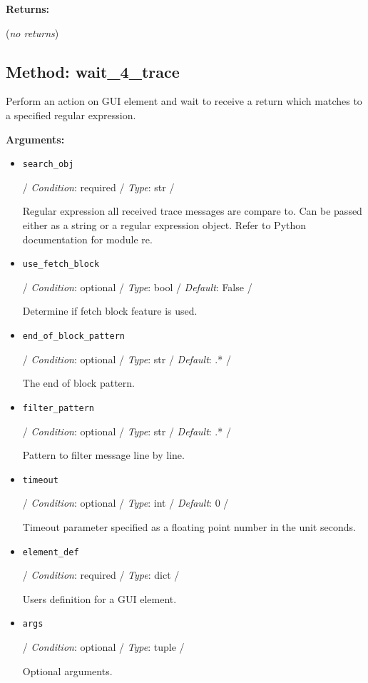 \textbf{Returns:}

(\emph{no returns})

\hypertarget{qconnectwinapp-winappdriver-winapp-client-winappclient-wait-4-trace}{%
\subsection{Method: wait\_4\_trace}\label{qconnectwinapp-winappdriver-winapp-client-winappclient-wait-4-trace}}

Perform an action on GUI element and wait to receive a return which
matches to a specified regular expression.

\textbf{Arguments:}

\begin{itemize}
\item
  \texttt{search\_obj}

  / \emph{Condition}: required / \emph{Type}: str /

  Regular expression all received trace messages are compare to. Can be
  passed either as a string or a regular expression object. Refer to
  Python documentation for module \textquotesingle re\textquotesingle.
\item
  \texttt{use\_fetch\_block}

  / \emph{Condition}: optional / \emph{Type}: bool / \emph{Default}:
  False /

  Determine if \textquotesingle fetch block\textquotesingle{} feature is
  used.
\item
  \texttt{end\_of\_block\_pattern}

  / \emph{Condition}: optional / \emph{Type}: str / \emph{Default}:
  \textquotesingle.*\textquotesingle{} /

  The end of block pattern.
\item
  \texttt{filter\_pattern}

  / \emph{Condition}: optional / \emph{Type}: str / \emph{Default}:
  \textquotesingle.*\textquotesingle{} /

  Pattern to filter message line by line.
\item
  \texttt{timeout}

  / \emph{Condition}: optional / \emph{Type}: int / \emph{Default}: 0 /

  Timeout parameter specified as a floating point number in the unit
  \textquotesingle seconds\textquotesingle.
\item
  \texttt{element\_def}

  / \emph{Condition}: required / \emph{Type}: dict /

  User\textquotesingle s definition for a GUI element.
\item
  \texttt{args}

  / \emph{Condition}: optional / \emph{Type}: tuple /

  Optional arguments.
\end{itemize}

